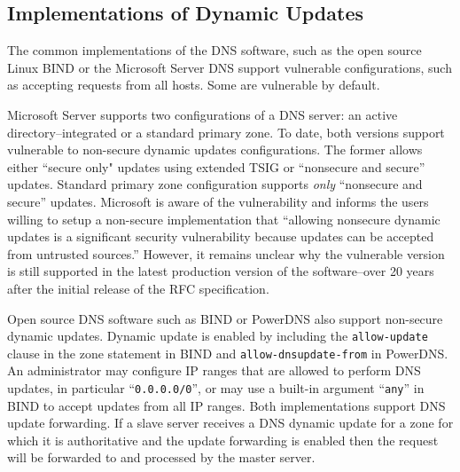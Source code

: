 \subsection{Implementations of Dynamic Updates}

The common implementations of the DNS software, such as the open source Linux BIND \cite{bind} or the Microsoft Server DNS support vulnerable configurations, such as accepting requests from all hosts.
Some are vulnerable by default.

Microsoft Server supports two configurations of a DNS server: an active directory--integrated or a standard primary zone.
To date, both versions support vulnerable to %
non-secure dynamic updates configurations.
The former allows either ``secure only" updates using extended TSIG or ``nonsecure and secure'' updates. %
Standard primary zone configuration supports \textit{only} ``nonsecure and secure''  updates.
Microsoft is aware of the vulnerability and informs the users willing to setup a non-secure implementation that ``allowing nonsecure dynamic updates is a significant security vulnerability because updates can be accepted from untrusted sources.''
However, it remains unclear why the vulnerable version is still supported in the latest production version of the software--over 20 years after the initial release of the RFC specification.

Open source DNS software such as BIND or PowerDNS also support non-secure dynamic updates. 
Dynamic update is enabled by including the \texttt{allow-update}  %
clause in the zone statement in BIND and \texttt{allow-dnsupdate-from} in PowerDNS.
An administrator may configure IP ranges that are allowed to perform DNS updates, in particular ``\texttt{0.0.0.0/0}'', or may use a built-in argument ``\texttt{any}'' in BIND to accept updates from all IP ranges.
Both implementations support DNS update forwarding.  
If a slave server receives a DNS dynamic update for a zone for which it is authoritative and the update forwarding is enabled then the request will be forwarded to and processed by the master server.

